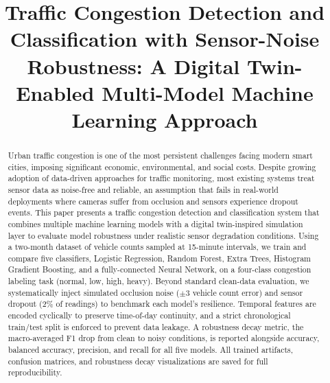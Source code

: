 \documentclass[conference,onecolumn,12pt]{IEEEtran}
\begin{document}
\title{Traffic Congestion Detection and Classification with
Sensor-Noise Robustness: A Digital Twin-Enabled
Multi-Model Machine Learning Approach}

\author{
}

\maketitle

\begin{abstract}
Urban traffic congestion is one of the most persistent challenges facing
modern smart cities, imposing significant economic, environmental, and social
costs. Despite growing adoption of data-driven approaches for traffic
monitoring, most existing systems treat sensor data as noise-free and
reliable, an assumption that fails in real-world deployments where cameras
suffer from occlusion and sensors experience dropout events. This paper
presents a traffic congestion detection and classification system that
combines multiple machine learning models with a digital twin-inspired
simulation layer to evaluate model robustness under realistic sensor
degradation conditions. Using a two-month dataset of vehicle counts sampled
at 15-minute intervals, we train and compare five classifiers, Logistic
Regression, Random Forest, Extra Trees, Histogram Gradient Boosting, and a
fully-connected Neural Network, on a four-class congestion labeling task
(normal, low, high, heavy). Beyond standard clean-data evaluation, we
systematically inject simulated occlusion noise ($\pm$3 vehicle count error)
and sensor dropout (2\% of readings) to benchmark each model's resilience.
Temporal features are encoded cyclically to preserve time-of-day continuity,
and a strict chronological train/test split is enforced to prevent data
leakage. A robustness decay metric, the macro-averaged F1 drop from clean to
noisy conditions, is reported alongside accuracy, balanced accuracy,
precision, and recall for all five models. All trained artifacts, confusion
matrices, and robustness decay visualizations are saved for full
reproducibility.
\end{abstract}
\end{document}
